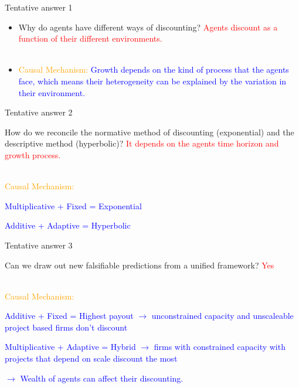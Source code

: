 \documentclass{beamer}
\numberwithin{equation}{section}
\begin{document}
\begin{frame}{Tentative answer 1}
\begin{itemize}
    \item Why do agents have different ways of discounting?\textcolor{red}{ Agents discount as a function of their different environments.}\\~\\
    \item \textcolor{orange}{Causal Mechanism:} \textcolor{blue}{Growth depends on the kind of process that the agents face, which means their heterogeneity can be explained by the variation in their environment.}
\end{itemize}
\end{frame}
\begin{frame}{Tentative answer 2}
\begin{itemize}
    \item How do we reconcile the normative method of discounting (exponential) and the descriptive method (hyperbolic)? \textcolor{red}{It depends on the agents time horizon and growth process.}\\~\\
    \item \textcolor{orange}{Causal Mechanism:} \textcolor{blue}{
    \item Multiplicative + Fixed = Exponential
    \item Additive + Adaptive = Hyperbolic}
\end{itemize}
\end{frame}
\begin{frame}{Tentative answer 3}
\begin{itemize}
    \item Can we draw out new falsifiable predictions from a unified framework? \textcolor{red}{Yes}\\~\\
    \item \textcolor{orange}{Causal Mechanism:} \textcolor{blue}{
    \item Additive + Fixed = Highest payout $\rightarrow$ unconstrained capacity and unscaleable project based firms don't discount
    \item Multiplicative + Adaptive = Hybrid $\rightarrow$ firms with constrained capacity with projects that depend on scale discount the most
    \item $\rightarrow$ Wealth of agents can affect their discounting. } 
\end{itemize}
\end{frame}
\end{document}

